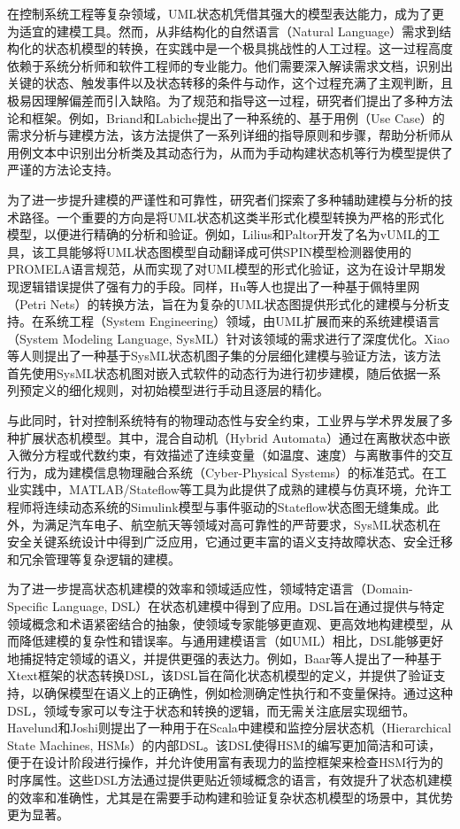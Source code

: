 在控制系统工程等复杂领域，UML状态机凭借其强大的模型表达能力，成为了更为适宜的建模工具。然而，从非结构化的自然语言（Natural Language）需求到结构化的状态机模型的转换，在实践中是一个极具挑战性的人工过程。这一过程高度依赖于系统分析师和软件工程师的专业能力。他们需要深入解读需求文档，识别出关键的状态、触发事件以及状态转移的条件与动作，这个过程充满了主观判断，且极易因理解偏差而引入缺陷。为了规范和指导这一过程，研究者们提出了多种方法论和框架。例如，Briand和Labiche提出了一种系统的、基于用例（Use Case）的需求分析与建模方法，该方法提供了一系列详细的指导原则和步骤，帮助分析师从用例文本中识别出分析类及其动态行为，从而为手动构建状态机等行为模型提供了严谨的方法论支持。

为了进一步提升建模的严谨性和可靠性，研究者们探索了多种辅助建模与分析的技术路径。一个重要的方向是将UML状态机这类半形式化模型转换为严格的形式化模型，以便进行精确的分析和验证。例如，Lilius和Paltor开发了名为vUML的工具，该工具能够将UML状态图模型自动翻译成可供SPIN模型检测器使用的PROMELA语言规范，从而实现了对UML模型的形式化验证，这为在设计早期发现逻辑错误提供了强有力的手段。同样，Hu等人也提出了一种基于佩特里网（Petri Nets）的转换方法，旨在为复杂的UML状态图提供形式化的建模与分析支持。在系统工程（System Engineering）领域，由UML扩展而来的系统建模语言（System Modeling Language, SysML）针对该领域的需求进行了深度优化。Xiao等人则提出了一种基于SysML状态机图子集的分层细化建模与验证方法，该方法首先使用SysML状态机图对嵌入式软件的动态行为进行初步建模，随后依据一系列预定义的细化规则，对初始模型进行手动且逐层的精化。

与此同时，针对控制系统特有的物理动态性与安全约束，工业界与学术界发展了多种扩展状态机模型。其中，混合自动机（Hybrid Automata）通过在离散状态中嵌入微分方程或代数约束，有效描述了连续变量（如温度、速度）与离散事件的交互行为，成为建模信息物理融合系统（Cyber-Physical Systems）的标准范式。在工业实践中，MATLAB/Stateflow等工具为此提供了成熟的建模与仿真环境，允许工程师将连续动态系统的Simulink模型与事件驱动的Stateflow状态图无缝集成。此外，为满足汽车电子、航空航天等领域对高可靠性的严苛要求，SysML状态机在安全关键系统设计中得到广泛应用，它通过更丰富的语义支持故障状态、安全迁移和冗余管理等复杂逻辑的建模。

为了进一步提高状态机建模的效率和领域适应性，领域特定语言（Domain-Specific Language, DSL）在状态机建模中得到了应用。DSL旨在通过提供与特定领域概念和术语紧密结合的抽象，使领域专家能够更直观、更高效地构建模型，从而降低建模的复杂性和错误率。与通用建模语言（如UML）相比，DSL能够更好地捕捉特定领域的语义，并提供更强的表达力。例如，Baar等人提出了一种基于Xtext框架的状态转换DSL，该DSL旨在简化状态机模型的定义，并提供了验证支持，以确保模型在语义上的正确性，例如检测确定性执行和不变量保持。通过这种DSL，领域专家可以专注于状态和转换的逻辑，而无需关注底层实现细节。Havelund和Joshi则提出了一种用于在Scala中建模和监控分层状态机（Hierarchical State Machines, HSMs）的内部DSL。该DSL使得HSM的编写更加简洁和可读，便于在设计阶段进行操作，并允许使用富有表现力的监控框架来检查HSM行为的时序属性。这些DSL方法通过提供更贴近领域概念的语言，有效提升了状态机建模的效率和准确性，尤其是在需要手动构建和验证复杂状态机模型的场景中，其优势更为显著。

